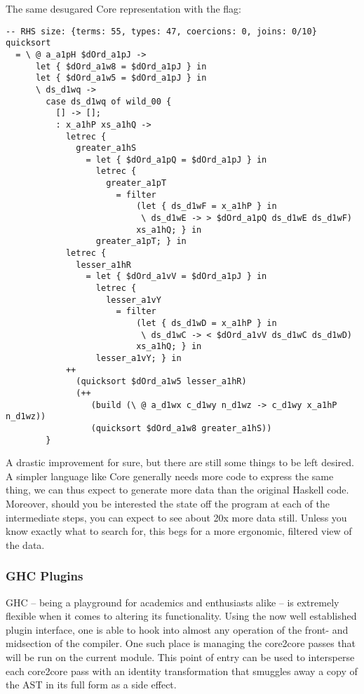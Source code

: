 The same desugared Core representation with the  flag:

\begin{listing}[H]
\begin{verbatim}
-- RHS size: {terms: 55, types: 47, coercions: 0, joins: 0/10}
quicksort
  = \ @ a_a1pH $dOrd_a1pJ ->
      let { $dOrd_a1w8 = $dOrd_a1pJ } in
      let { $dOrd_a1w5 = $dOrd_a1pJ } in
      \ ds_d1wq ->
        case ds_d1wq of wild_00 {
          [] -> [];
          : x_a1hP xs_a1hQ ->
            letrec {
              greater_a1hS
                = let { $dOrd_a1pQ = $dOrd_a1pJ } in
                  letrec {
                    greater_a1pT
                      = filter
                          (let { ds_d1wF = x_a1hP } in
                           \ ds_d1wE -> > $dOrd_a1pQ ds_d1wE ds_d1wF)
                          xs_a1hQ; } in
                  greater_a1pT; } in
            letrec {
              lesser_a1hR
                = let { $dOrd_a1vV = $dOrd_a1pJ } in
                  letrec {
                    lesser_a1vY
                      = filter
                          (let { ds_d1wD = x_a1hP } in
                           \ ds_d1wC -> < $dOrd_a1vV ds_d1wC ds_d1wD)
                          xs_a1hQ; } in
                  lesser_a1vY; } in
            ++
              (quicksort $dOrd_a1w5 lesser_a1hR)
              (++
                 (build (\ @ a_d1wx c_d1wy n_d1wz -> c_d1wy x_a1hP n_d1wz))
                 (quicksort $dOrd_a1w8 greater_a1hS))
        }

\end{verbatim}
\label{code:quicksort_core_dsuppress}
\end{listing}

A drastic improvement for sure, but there are still some things to be left desired.
A simpler language like Core generally needs more code to express the same thing, we can thus expect
to generate more data than the original Haskell code. Moreover, should you be interested the state off
the program at each of the intermediate steps, you can expect to see about 20x more data still.
Unless you know exactly what to search for, this begs for a more ergonomic, filtered view of the data.

\subsubsection{GHC Plugins}

GHC -- being a playground for academics and enthusiasts alike -- is extremely flexible when it comes to
altering its functionality. Using the now well established plugin interface, one is able to hook into almost
any operation of the front- and midsection of the compiler. One such place is managing the core2core passes that
will be run on the current module. This point of entry can be used to intersperse each core2core pass with an
identity transformation that smuggles away a copy of the AST in its full form as a side effect.

